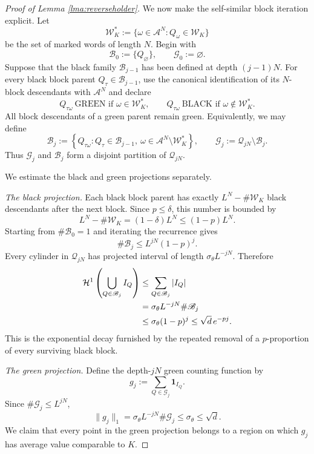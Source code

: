 \documentclass[12pt]{amsart}
\numberwithin{equation}{section}
\begin{document}
\begin{proof}[Proof of Lemma \ref{lma:reverseholder}]
We now make the self-similar block iteration explicit.  Let
\[
 \mathscr W_K^*
 :=\{\omega\in\mathcal A^N:Q_\omega\in\mathscr W_K\}
\]
be the set of marked words of length $N$.  Begin with
\[
 \mathscr B_0:=\{Q_\varnothing\},
 \qquad
 \mathscr G_0:=\varnothing.
\]
Suppose that the black family $\mathscr B_{j-1}$ has been defined at depth
$(j-1)N$.  For every black block parent $Q_\tau\in\mathscr B_{j-1}$, use
the canonical identification of its $N$-block descendants with
$\mathcal A^N$ and declare
\[
 Q_{\tau\omega}\ \text{GREEN if }\omega\in\mathscr W_K^*,
 \qquad
 Q_{\tau\omega}\ \text{BLACK if }\omega\notin\mathscr W_K^*.
\]
All block descendants of a green parent remain green.  Equivalently, we may
define
\begin{equation}\label{eq:black-family-recursion}
 \mathscr B_j
 :=\left\{
 Q_{\tau\omega}:
 Q_\tau\in\mathscr B_{j-1},\ 
 \omega\in\mathcal A^N\setminus\mathscr W_K^*
 \right\},
 \qquad
 \mathscr G_j:=\mathscr Q_{jN}\setminus\mathscr B_j.
\end{equation}
Thus $\mathscr G_j$ and $\mathscr B_j$ form a disjoint partition of
$\mathscr Q_{jN}$.

We estimate the black and green projections separately.

\smallskip
\noindent\emph{The black projection.}
Each black block parent has exactly $L^N-\#\mathscr W_K$ black descendants
after the next block.  Since $p\leq\delta$, this number is bounded by
\[
 L^N-\#\mathscr W_K
 =(1-\delta)L^N
 \leq(1-p)L^N.
\]
Starting from $\#\mathscr B_0=1$ and iterating the recurrence gives
\begin{equation}\label{eq:blackcylindercount}
 \#\mathscr B_j
 \leq L^{jN}(1-p)^j.
\end{equation}
Every cylinder in $\mathscr Q_{jN}$ has projected interval of length
$\sigma_\theta L^{-jN}$.  Therefore
\begin{align}
 \mathcal H^1\left(\bigcup_{Q\in\mathscr B_j}I_Q\right)
 &\leq\sum_{Q\in\mathscr B_j}|I_Q|\notag\\
 &=\sigma_\theta L^{-jN}\#\mathscr B_j\notag\\
 &\leq\sigma_\theta(1-p)^j
 \leq\sqrt d\,e^{-pj}.
 \label{eq:blackprojectionbound}
\end{align}
This is the exponential decay furnished by the repeated removal of a
$p$-proportion of every surviving black block.

\smallskip
\noindent\emph{The green projection.}
Define the depth-$jN$ green counting function by
\begin{equation}\label{eq:green-block-counting}
 g_j:=\sum_{Q\in\mathscr G_j}\mathbf1_{I_Q}.
\end{equation}
Since $\#\mathscr G_j\leq L^{jN}$,
\begin{equation}\label{eq:green-block-L1}
 \|g_j\|_1
 =\sigma_\theta L^{-jN}\#\mathscr G_j
 \leq\sigma_\theta
 \leq\sqrt d.
\end{equation}
We claim that every point in the green projection belongs to a region on
which $g_j$ has average value comparable to $K$.


\end{proof}
\end{document}
